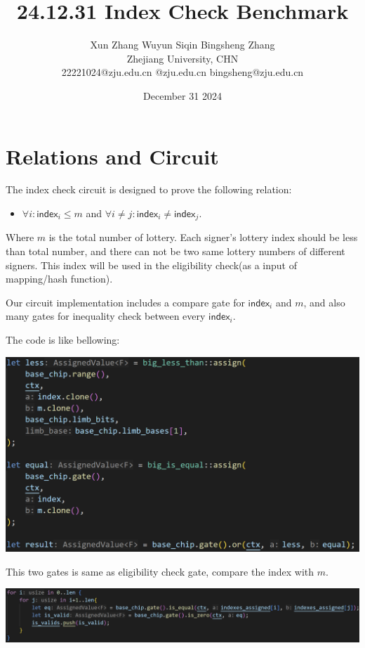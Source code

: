 \documentclass{article}
\title{24.12.31 Index Check Benchmark}
\author{Xun Zhang \quad \quad Wuyun Siqin \quad \quad Bingsheng Zhang \\ 
Zhejiang University, CHN \\
22221024@zju.edu.cn \quad 3210101763@zju.edu.cn \quad bingsheng@zju.edu.cn}
\date{December 31 2024}
\begin{document}
\maketitle

\section{Relations and Circuit}

The index check circuit is designed to prove the following relation:

\begin{itemize}
    \item $\forall i : \mathsf{index}_i \leq m$ and $\forall i \neq j : \mathsf{index}_i \neq \mathsf{index}_j$.

\end{itemize}

Where $m$ is the total number of lottery. Each signer's lottery index should be less than total number, and there can not be two same lottery numbers of different signers. This index will be used in the eligibility check(as a input of mapping/hash function).


Our circuit implementation includes a compare gate for $\mathsf{index}_i$ and $m$, and also many gates for inequality check between every $\mathsf{index}_i$.

The code is like bellowing:

\vspace{0.5cm}

\includegraphics[width=1\linewidth]{index_check_code1.png}

This two gates is same as eligibility check gate, compare the index with $m$.

\includegraphics[width=1\linewidth]{index_check_code2.png}
\end{document}
